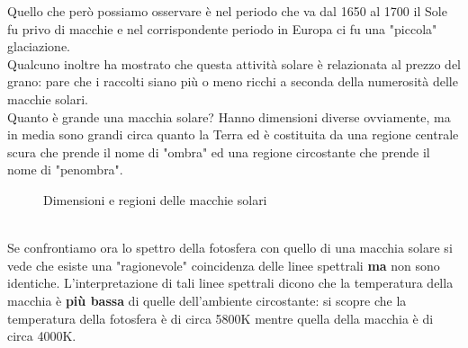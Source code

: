 \documentclass[a4paper,11pt]{article}
\begin{document}
        Quello che però possiamo osservare è nel periodo che va dal 1650 al 1700 il Sole fu privo di macchie e nel corrispondente periodo in Europa ci fu una "piccola" glaciazione. \\
        Qualcuno inoltre ha mostrato che questa attività solare è relazionata al prezzo del grano: pare che i raccolti siano più o meno ricchi a seconda della numerosità delle macchie solari. \\
        Quanto è grande una macchia solare? Hanno dimensioni diverse ovviamente, ma in media sono grandi circa quanto la Terra ed è costituita da una regione centrale scura che prende il nome di "ombra" ed una regione circostante che prende il nome di "penombra".
        \\
        \begin{figure}[h!!]
            \centering
            \qquad
            \caption{Dimensioni e regioni delle macchie solari}%
            \label{fig:FormeMacchie}%
        \end{figure}
        \\
        Se confrontiamo ora lo spettro della fotosfera con quello di una macchia solare si vede che esiste una "ragionevole" coincidenza delle linee spettrali \textbf{ma} non sono identiche.
        L'interpretazione di tali linee spettrali dicono che la temperatura della macchia è \textbf{più bassa} di quelle dell'ambiente circostante: si scopre che la temperatura della fotosfera è di circa 5800K mentre quella della macchia è di circa 4000K.
        \\
\end{document}
